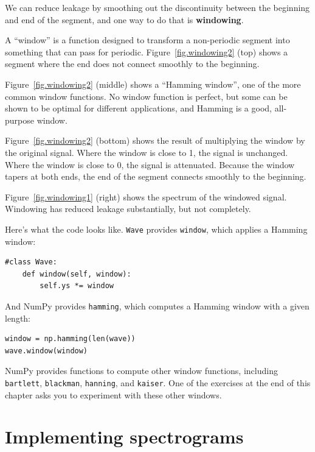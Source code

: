 \documentclass[12pt]{book}
\begin{document}
We can reduce leakage by smoothing out the discontinuity between
the beginning and end of the segment, and one way to do that is
{\bf windowing}.

A ``window'' is a function designed to transform a non-periodic
segment into something that can pass for periodic.
Figure~\ref{fig.windowing2} (top) shows a segment where the end does not
connect smoothly to the beginning.

Figure~\ref{fig.windowing2} (middle) shows a ``Hamming window'', one of the
more common window functions.  No window function is perfect, but some
can be shown to be optimal for different applications, and Hamming
is a good, all-purpose window.

Figure~\ref{fig.windowing2} (bottom) shows the result of multiplying the
window by the original signal.  Where the window is close to 1, the
signal is unchanged.  Where the window is close to 0, the signal is
attenuated.  Because the window tapers at both ends, the end of the
segment connects smoothly to the beginning.

Figure~\ref{fig.windowing1} (right) shows the spectrum of the windowed
signal.  Windowing has reduced leakage substantially, but not
completely.

Here's what the code looks like.  {\tt Wave} provides {\tt window},
which applies a Hamming window:

\begin{verbatim}
#class Wave:
    def window(self, window):
        self.ys *= window
\end{verbatim}

And NumPy provides {\tt hamming}, which computes a Hamming window
with a given length:

\begin{verbatim}
window = np.hamming(len(wave))
wave.window(window)
\end{verbatim}

NumPy provides functions to compute other window
functions, including {\tt bartlett}, {\tt blackman}, {\tt hanning},
and {\tt kaiser}.  One of the exercises at the end of this chapter
asks you to experiment with these other windows.


\section{Implementing spectrograms}
\end{document}
